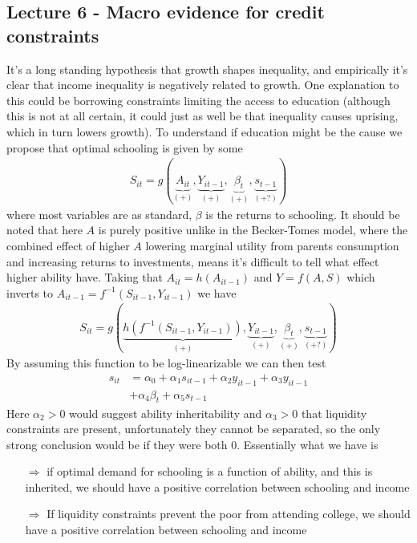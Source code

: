 \documentclass[12pt, a4paper]{article}
\begin{document}
\begin{multicols}{2}
\subsection{Lecture 6 - Macro evidence for credit constraints}
It's a long standing hypothesis that growth shapes inequality, and empirically it's clear that income inequality is negatively related to growth. One explanation to this could be borrowing constraints limiting the access to education (although this is not at all certain, it could just as well be that inequality causes uprising, which in turn lowers growth). To understand if education might be the cause we propose that optimal schooling is given by some
\begin{align*}
S_{it}=g(\underbrace{A_{it}}_{(+)}, \underbrace{Y_{it-1}}_{(+)}, \underbrace{\beta_{t}}_{(+)}, \underbrace{s_{t-1}}_{(+?)})
\end{align*}
where most variables are as standard, $\beta$ is the returns to schooling. It should be noted that here $A$ is purely positive unlike in the Becker-Tomes model, where the combined effect of higher $A$ lowering marginal utility from parents consumption and increasing returns to investments, means it's difficult to tell what effect higher ability have. Taking that $A_{it}=h(A_{it-1})$ and $Y=f(A,S)$ which inverts to $A_{it-1}= f^{-1}(S_{it-1}, Y_{it-1})$ we have
\begin{align*}
S_{it}=g(\underbrace{h(f^{-1}(S_{it-1}, Y_{it-1})) }_{(+)}, \underbrace{Y_{it-1}}_{(+)}, \underbrace{\beta_{t}}_{(+)}, \underbrace{s_{t-1}}_{(+?)})
\end{align*}
By assuming this function to be log-linearizable we can then test
\begin{align*}
s_{it} &= \alpha_0 + \alpha_1 s_{it-1} + \alpha_2 y_{it-1} + \alpha_3 y_{it-1} \\
& + \alpha_4 \beta_t + \alpha_5 s_{t-1}
\end{align*}
Here $\alpha_2>0$ would suggest ability inheritability and $\alpha_3>0$ that liquidity constraints are present, unfortunately they cannot be separated, so the only strong conclusion would be if they were both 0. Essentially what we have is
\begin{itemize}
\item[$\Rightarrow$] if optimal demand for schooling is a function of ability, and this is inherited, we should have a positive correlation between schooling and income
\item[$\Rightarrow$] If liquidity constraints prevent the poor from attending college, we should have a positive correlation between schooling and income

\end{itemize}
\end{multicols}
\end{document}
